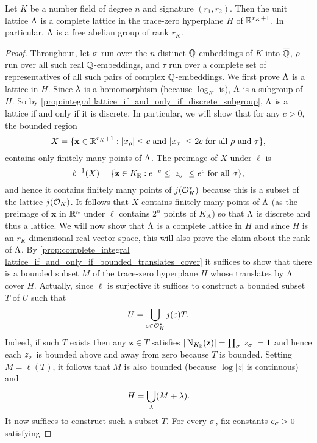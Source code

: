     \begin{theorem}\label{thm:unit_group_complete_lattice}
      Let $K$ be a number field of degree $n$ and signature $(r_{1},r_{2})$. Then the unit lattice $\Lambda$ is a complete lattice in the trace-zero hyperplane $H$ of $\mathbb{R}^{r_{K}+1}$. In particular, $\Lambda$ is a free abelian group of rank $r_{K}$.
    \end{theorem}
    \begin{proof}
      Throughout, let $\sigma$ run over the $n$ distinct $\mathbb{Q}$-embeddings of $K$ into $\overline{\mathbb{Q}}$, $\rho$ run over all such real $\mathbb{Q}$-embeddings, and $\tau$ run over a complete set of representatives of all such pairs of complex $\mathbb{Q}$-embeddings. We first prove $\Lambda$ is a lattice in $H$. Since $\lambda$ is a homomorphism (because $\log_{K}$ is), $\Lambda$ is a subgroup of $H$. So by \cref{prop:integral lattice_if_and_only_if_discrete_subgroup}, $\Lambda$ is a lattice if and only if it is discrete. In particular, we will show that for any $c > 0$, the bounded region
      \[
        X = \{\mathbf{x} \in \mathbb{R}^{r_{K}+1}:\text{$|x_{\rho}| \le c$ and $|x_{\tau}| \le 2c$ for all $\rho$ and $\tau$}\},
      \]
      contains only finitely many points of $\Lambda$. The preimage of $X$ under $\ell$ is
      \[
        \ell^{-1}(X) = \{\mathbf{z} \in K_{\mathbb{R}}:\text{$e^{-c} \le |z_{\sigma}| \le e^{c}$ for all $\sigma$}\},
      \]
      and hence it contains finitely many points of $j(\mathcal{O}_{K}^{\ast})$ because this is a subset of the lattice $j(\mathcal{O}_{K})$. It follows that $X$ contains finitely many points of $\Lambda$ (as the preimage of $\mathbf{x}$ in $\mathbb{R}^{n}$ under $\ell$ contains $2^{n}$ points of $K_{\mathbb{R}}$) so that $\Lambda$ is discrete and thus a lattice. We will now show that $\Lambda$ is a complete lattice in $H$ and since $H$ is an $r_{K}$-dimensional real vector space, this will also prove the claim about the rank of $\Lambda$. By \cref{prop:complete_integral lattice_if_and_only_if_bounded_translates_cover} it suffices to show that there is a bounded subset $M$ of the trace-zero hyperplane $H$ whose translates by $\Lambda$ cover $H$. Actually, since $\ell$ is surjective it suffices to construct a bounded subset $T$ of $U$ such that
      \[
        U = \bigcup_{\varepsilon \in \mathcal{O}_{K}^{\ast}}j(\varepsilon)T.
      \]
      Indeed, if such $T$ exists then any $\mathbf{z} \in T$ satisfies $|\operatorname{\mathrm{N}}_{K_{\mathbb{R}}}(\mathbf{z})| = \prod_{\sigma}|z_{\sigma}| = 1$ and hence each $z_{\sigma}$ is bounded above and away from zero because $T$ is bounded. Setting $M = \ell(T)$, it follows that $M$ is also bounded (because $\log|z|$ is continuous) and
      \[
        H = \bigcup_{\lambda}(M+\lambda).
      \]
      It now suffices to construct such a subset $T$. For every $\sigma$, fix constants $c_{\sigma} > 0$ satisfying

\end{proof}
